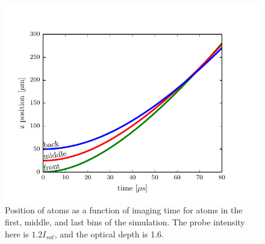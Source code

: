 \documentclass[12pt]{iopart}
\begin{document}
\begin{figure}
	\includegraphics{figure4.pdf}
\caption{Position of atoms as a function of imaging time for atoms in the first, middle, and last bins of the simulation. The probe intensity here is $1.2 I_{sat}$, and the optical depth is 1.6.}  
\label{fig:atomTravel}
\end{figure}
\end{document}
